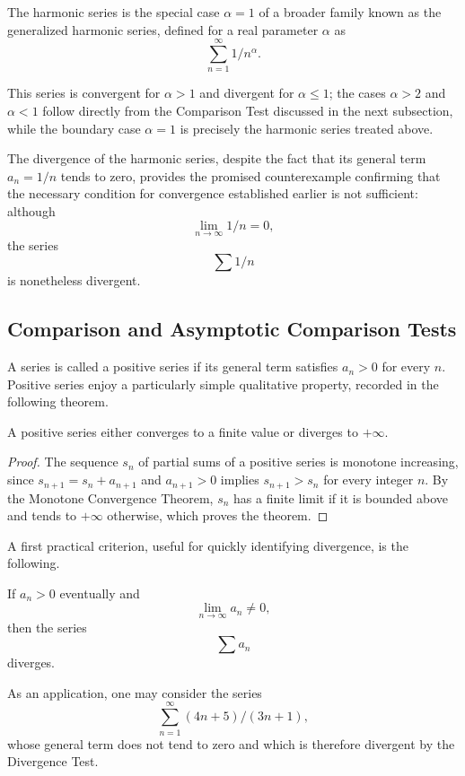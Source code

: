 The harmonic series is the special case $\alpha = 1$ of a broader family known as the generalized harmonic series, defined for a real parameter $\alpha$ as
\[
\sum_{n=1}^{\infty} 1/n^\alpha.
\]

This series is convergent for $\alpha > 1$ and divergent for $\alpha \leq 1$; the cases $\alpha > 2$ and $\alpha < 1$ follow directly from the Comparison Test discussed in the next subsection, while the boundary case $\alpha = 1$ is precisely the harmonic series treated above.

The divergence of the harmonic series, despite the fact that its general term $a_n = 1/n$ tends to zero, provides the promised counterexample confirming that the necessary condition for convergence established earlier is not sufficient: although \[
\lim_{n \to \infty} 1/n = 0,
\] the series \[
\sum 1/n
\] is nonetheless divergent.

\subsection{Comparison and Asymptotic Comparison Tests}

A series is called a positive series if its general term satisfies $a_n > 0$ for every $n$. Positive series enjoy a particularly simple qualitative property, recorded in the following theorem.

\begin{theorem}
A positive series either converges to a finite value or diverges to $+\infty$.
\end{theorem}

\begin{proof}
The sequence $s_n$ of partial sums of a positive series is monotone increasing, since $s_{n+1} = s_n + a_{n+1}$ and $a_{n+1} > 0$ implies $s_{n+1} > s_n$ for every integer $n$. By the Monotone Convergence Theorem, $s_n$ has a finite limit if it is bounded above and tends to $+\infty$ otherwise, which proves the theorem.
\end{proof}

A first practical criterion, useful for quickly identifying divergence, is the following.

\begin{theorem}
If $a_n > 0$ eventually and \[
\lim_{n \to \infty} a_n \neq 0,
\] then the series \[
\sum a_n
\] diverges.
\end{theorem}

As an application, one may consider the series
\[
\sum_{n=1}^{\infty} (4n+5)/(3n+1),
\]
whose general term does not tend to zero and which is therefore divergent by the Divergence Test.


